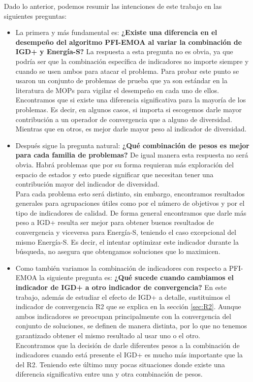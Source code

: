 Dado lo anterior, podemos resumir las intenciones de este trabajo en las siguientes preguntas:

\begin{itemize}
    \item La primera y más fundamental es: \textbf{¿Existe una diferencia en el desempeño del algoritmo PFI-EMOA al variar la combinación de IGD+ y Energía-S?}
    La respuesta a esta pregunta no es obvia, ya que podría ser que la combinación específica de indicadores no importe siempre y cuando se usen ambos para atacar el problema. Para probar este punto se usaron un conjunto de problemas de prueba que ya son estándar en la literatura de MOPs para vigilar el desempeño en cada uno de ellos. 
    \\Encontramos que si existe una diferencia significativa para la mayoría de los problemas. Es decir, en algunos casos, si importa si escogemos darle mayor contribución a un operador de convergencia que a alguno de diversidad. Mientras que en otros, es mejor darle mayor peso al indicador de diversidad.
    \item Después sigue la pregunta natural: \textbf{¿Qué combinación de pesos es mejor para cada familia de problemas?}
    De igual manera esta respuesta no será obvia. Habrá problemas que por su forma requieran más exploración del espacio de estados y esto puede significar que necesitan tener una contribución mayor del indicador de diversidad. \\
    Para cada problema esto será distinto, sin embargo, encontramos resultados generales para agrupaciones útiles como por el número de objetivos y por el tipo de indicadores de calidad. De forma general encontramos que darle más peso a IGD+ resulta ser mejor para obtener buenos resultados de convergencia y viceversa para Energía-S, teniendo el caso excepcional del mismo Energía-S. Es decir, el intentar optimizar este indicador durante la búsqueda, no asegura que obtengamos soluciones que lo maximicen.
    \item Como también variamos la combinación de indicadores con respecto a PFI-EMOA la siguiente pregunta es: \textbf{¿Qué sucede cuando cambiamos el indicador de IGD+ a otro indicador de convergencia?}
    En este trabajo, además de estudiar el efecto de IGD+ a detalle, sustituimos el indicador de convergencia R2 \cite{R2} que se explica en la sección \ref{sec:R2}. Aunque ambos indicadores se preocupan principalmente con la convergencia del conjunto de soluciones, se definen de manera distinta, por lo que no tenemos garantizado obtener el mismo resultado al usar uno o el otro.\\
    Encontramos que la decisión de darle diferentes pesos a la combinación de indicadores cuando está presente el IGD+ es mucho más importante que la del R2. Teniendo este último muy pocas situaciones donde existe una diferencia significativa entre una y otra combinación de pesos.
   
\end{itemize}


